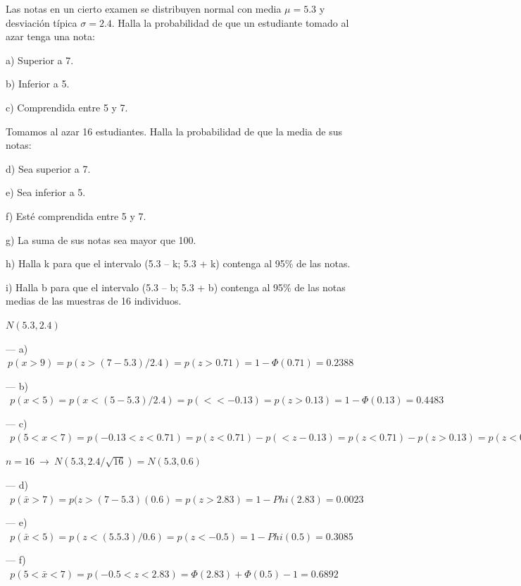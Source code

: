 \vspace{4mm}
\begin{ejemplo}
\begin{ejer}
	Las notas en un cierto examen se distribuyen normal con media $\mu = 5.3$ y desviación típica $\sigma = 2.4$. Halla la probabilidad de que un estudiante tomado al azar tenga una nota:
	
a) Superior a 7.

b) Inferior a 5.

c) Comprendida entre 5 y 7.

Tomamos al azar 16 estudiantes. Halla la probabilidad de que la media de sus notas:

d) Sea superior a 7.

e) Sea inferior a 5.

f) Esté comprendida entre 5 y 7.

g) La suma de sus notas sea mayor que 100.

h) Halla k para que el intervalo (5.3 -- k; 5.3 + k) contenga al 95\% de las notas.

i) Halla b para que el intervalo (5.3 -- b; 5.3 + b) contenga al 95\% de las notas medias de las muestras de 16 individuos.
\end{ejer}	
\end{ejemplo}

$N(5.3,2.4)$

\vspace{2mm} --- a) $\ p(x>9)=p(z>(7-5.3)/2.4)=p(z>0.71)=1-\Phi(0.71)=0.2388$

\vspace{2mm} --- b) $\ \ p(x<5)=p(x<(5-5.3)/2.4)=p(<<-0.13)=p(z>0.13)=1-\Phi(0.13)=0.4483$

\vspace{2mm} --- c) $\ \ p(5<x<7)=p(-0.13<z<0.71)=p(z<0.71)-p(<z-0.13)=p(z<0.71)-p(z>0.13)=p(z<0.71)-[1-p(z<0.13)]=	\Phi(0.71)+\Phi(0.13)-1=0.3129$

\vspace{2mm} $n=16 \ \to \ N(5.3,2.4/\sqrt{16})=N(5.3,0.6)$

\vspace{2mm} --- d) $\ \ p(\bar x>7)=p(z>(7-5.3)(0.6)=p(z>2.83)=1-	Phi(2.83)=0.0023$

\vspace{2mm} --- e) $\ \ p(\bar x<5)=p(z<(5.5.3)/0.6)=p(z<-0.5)=1-	Phi(0.5)=0.3085$

\vspace{2mm} --- f) $\ \ p(5<\bar x<7)=p(-0.5<z<2.83)=\Phi(2.83)+\Phi(0.5)-1=0.6892$

